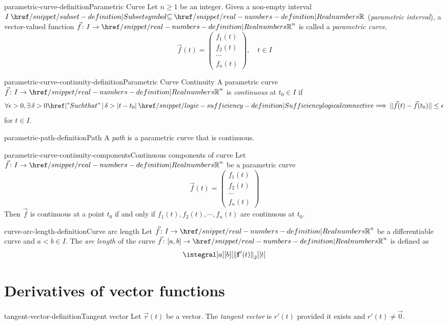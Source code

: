 \documentclass[preview]{standalone}
\begin{document}
\genpage

\begin{snippetdefinition}{parametric-curve-definition}{Parametric Curve}
    Let \(n \geq 1\) be an integer.
    Given a non-empty interval \(I \subseteq \realnumbers\)
    (\textit{parametric interval}), a vector-valued function \(\vec{f} \colon I\to{\realnumbers}^n\)
    is called a \textit{parametric curve}.
    \[
        \vec{f}(t) = \begin{pmatrix}
            f_1(t) \\
            f_2(t) \\
            \cdots \\
            f_n(t)
        \end{pmatrix}, \quad t \in I
    \]
\end{snippetdefinition}

\begin{snippetdefinition}{parametric-curve-continuity-definition}{Parametric Curve Continuity}
    A parametric curve \(\vec{f} \colon I \to {\realnumbers}^n\)
    is \textit{continuous} at \(t_0 \in I\)
    if
    \[
        \forall \epsilon > 0, 
        \exists \, \delta > 0 \suchthat \delta > |t-t_0|
        \implies ||\vec{f}(t) - \vec{f}(t_0)|| \leq \epsilon
    \]
    for \(t \in I\).
\end{snippetdefinition}

\begin{snippetdefinition}{parametric-path-definition}{Path}
    A \textit{path} is a parametric curve
    that is continuous.
\end{snippetdefinition}

\begin{snippetproposition}{parametric-curve-continuity-components}{Continuous components of curve}
    Let \(\vec{f} \colon I \to {\realnumbers}^n\) be a parametric curve
    \[
        \vec{f}(t) = \begin{pmatrix}
                f_1(t) \\
                f_2(t) \\
                \cdots \\
                f_n(t)
        \end{pmatrix}
    \]
    Then \(\vec{f}\) is continuous at a point \(t_0\) if and only if
    \(f_1(t), f_2(t), \cdots, f_n(t)\) are continuous at \(t_0\).
\end{snippetproposition}

\begin{snippetdefinition}{curve-arc-length-definition}{Curve arc length}
    Let \(\vec{f} \colon I\to{\realnumbers}^n\) be a differentiable curve
    and \(a < b \in I\).
    The \textit{arc length} of the curve \(\vec{f} \colon [a,b] \to {\realnumbers}^n\)
    is defined as
    \[
        \integral[a][b][\left\|\mathbf{f}^{\prime}(t)\right\|_2][t]
    \]
\end{snippetdefinition}

\section{Derivatives of vector functions}

\begin{snippetdefinition}{tangent-vector-definition}{Tangent vector}
    Let \(\vec{r}(t)\) be a \function vector.
    The \textit{tangent vector} is \(r'(t)\) provided it exists and \(r'(t)\neq\vec{0}\).
\end{snippetdefinition}
\end{document}
